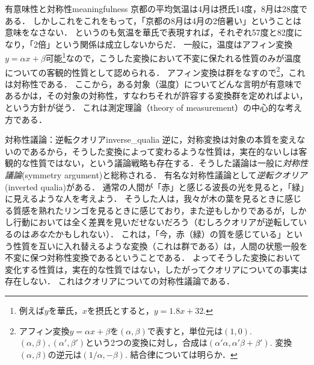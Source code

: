 \documentclass[11pt,a4paper, dvipdfmx]{jsarticle}
\begin{document}
\begin{rei}{有意味性と対称性}{meaningfulness}
京都の平均気温は4月は摂氏14度，8月は28度である．
しかしこれをこれをもって，「京都の8月は4月の2倍暑い」ということは意味をなさない．
というのも気温を華氏で表現すれば，それぞれ57度と82度になり，「2倍」という関係は成立しないからだ．
一般に，温度はアフィン変換$y = \alpha x + \beta$可能\footnote{例えば$y$を華氏，$x$を摂氏とすると，$y = 1.8x+32$.}なので，こうした変換において不変に保たれる性質のみが温度についての客観的性質として認められる．
アフィン変換は群をなすので\footnote{アフィン変換$y=\alpha x + \beta$を$(\alpha, \beta)$で表すと，単位元は$(1,0)$. $(\alpha, \beta), (\alpha',\beta')$という2つの変換に対し，合成は$(\alpha' \alpha, \alpha' \beta + \beta')$. 変換$(\alpha, \beta)$の逆元は$(1/\alpha, -\beta)$. 結合律については明らか．}，これは対称性である．
ここから，ある対象（温度）についてどんな言明が有意味であるかは，その対象の対称性，すなわちそれが許容する変換群を定めればよい，という方針が従う．
これは測定理論（theory of measurement）の中心的な考え方である\citep[e.g,][]{Narens2007-ty}．
\end{rei}


\begin{rei}{対称性議論：逆転クオリア}{inverse_qualia}
逆に，対称変換は対象の本質を変えないのであるから，そうした変換によって変わるような性質は，実在的ないしは客観的な性質ではない，という議論戦略も存在する．そうした議論は一般に\emph{対称性議論}(symmetry argument)と総称される．
有名な対称性議論として\emph{逆転クオリア}(inverted qualia)がある．
通常の人間が「赤」と感じる波長の光を見ると，「緑」に見えるような人を考えよう．
そうした人は，我々が木の葉を見るときに感じる質感を熟れたリンゴを見るときに感じており，また逆もしかりであるが，しかし行動においては全く差異を見いだせないだろう（むしろクオリアが逆転しているのは\emph{あなた}かもしれない）．
これは，「今，赤（緑）の質を感じている」という性質を互いに入れ替えるような変換（これは群である）は，人間の状態一般を不変に保つ対称性変換であるということである．
よってそうした変換において変化する性質は，実在的な性質ではない，したがってクオリアについての事実は存在しない．
これはクオリアについての対称性議論である．
\end{rei}
\end{document}
